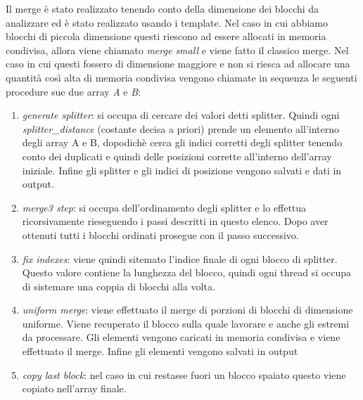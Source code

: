 \documentclass[]{IEEEtran}
\begin{document}
	Il merge è stato realizzato tenendo conto della dimensione dei blocchi da analizzare ed è stato realizzato usando i template. Nel caso in cui abbiamo blocchi di piccola dimensione questi riescono ad essere allocati in memoria condivisa, allora viene chiamato \textit{merge small} e viene fatto il classico merge. Nel caso in cui questi fossero di dimensione maggiore e non si riesca ad allocare una quantità così alta di memoria condivisa vengono chiamate in sequenza le seguenti procedure sue due array \textit{A} e \textit{B}:
	\begin{enumerate}
		\item \textit{generate splitter}: si occupa di cercare dei valori detti splitter. Quindi ogni \textit{splitter\_distance} (costante decisa a priori) prende un elemento all'interno degli array A e B, dopodichè cerca gli indici corretti degli splitter tenendo conto dei duplicati e quindi delle posizioni corrette all'interno dell'array iniziale. Infine gli splitter e gli indici di posizione vengono salvati e dati in output.
		\item \textit{merge3 step}: si occupa dell'ordinamento degli splitter e lo effettua ricorsivamente rieseguendo i passi descritti in questo elenco. Dopo aver ottenuti tutti i blocchi ordinati prosegue con il passo successivo.
		\item \textit{fix indexes}: viene quindi sitemato l'indice finale di ogni blocco di splitter. Questo valore contiene la lunghezza del blocco, quindi ogni thread si occupa di sistemare una coppia di blocchi alla volta.
		\item \textit{uniform merge}: viene effettuato il merge di porzioni di blocchi di dimensione uniforme. Viene recuperato il blocco sulla quale lavorare e anche gli estremi da processare. Gli elementi vengono caricati in memoria condivisa e viene effettuato il merge. Infine gli elementi vengono salvati in output
		\item \textit{copy last block}: nel caso in cui restasse fuori un blocco spaiato questo viene copiato nell'array finale.
	\end{enumerate} 

\end{document}
